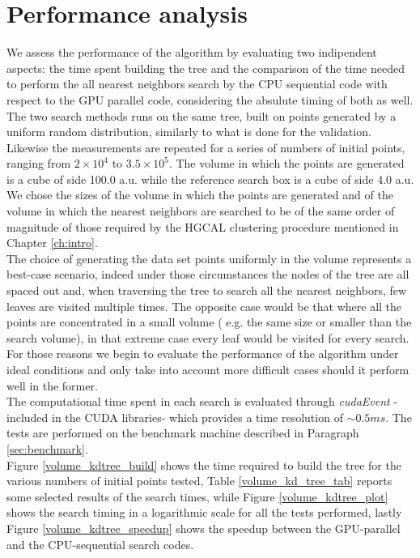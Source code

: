 \section{Performance analysis}\label{sec:volumeKd_performance}
We assess the performance of the algorithm by evaluating two indipendent aspects: the time spent building the tree and the comparison of the time needed to perform the all nearest neighbors search by the CPU sequential code with respect to the GPU parallel code, considering the absulute timing of both as well.\\
The two search methods runs on the same tree, built on points generated by a uniform random distribution, similarly to what is done for the validation. Likewise the measurements are repeated for a series of numbers of initial points, ranging from  $2 \times 10^{4}$ to $3.5 \times 10^{5}$. The volume in which the points are generated is a cube of side 100.0 a.u. while the reference search box is a cube of side 4.0 a.u.\\
We chose the sizes of the volume in which the points are generated and of the volume in which the nearest neighbors are searched to be of the same order of magnitude of those required by the HGCAL clustering procedure mentioned in Chapter \ref{ch:intro}.\\
The choice of generating the data set points uniformly in the volume represents a best-case scenario, indeed under those circumstances the nodes of the tree are all spaced out and, when traversing the tree to search all the nearest neighbors, few leaves are visited multiple times. The opposite case would be that where all the points are concentrated in a small volume ( e.g. the same size or smaller than the search volume), in that extreme case every leaf would be visited for every search. For those reasons we begin to evaluate the performance of the algorithm under ideal conditions and only take into account more difficult cases should it perform well in the former.\\
The computational time spent in each search is evaluated through \textit{cudaEvent} -included in the CUDA libraries- which provides a time resolution of $\sim 0.5\unit{ms}$. The tests are performed on the benchmark machine described in Paragraph \ref{sec:benchmark}.\\
Figure \ref{volume_kdtree_build} shows the time required to build the tree for the various numbers of initial points tested, Table \ref{volume_kd_tree_tab} reports some selected results of the search times, while Figure \ref{volume_kdtree_plot} shows the search timing in a logarithmic scale for all the tests performed, lastly Figure \ref{volume_kdtree_speedup} shows the speedup between the GPU-parallel and the CPU-sequential search codes.\\

